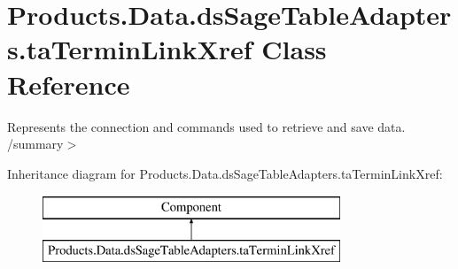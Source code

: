\hypertarget{class_products_1_1_data_1_1ds_sage_table_adapters_1_1ta_termin_link_xref}{}\section{Products.\+Data.\+ds\+Sage\+Table\+Adapters.\+ta\+Termin\+Link\+Xref Class Reference}
\label{class_products_1_1_data_1_1ds_sage_table_adapters_1_1ta_termin_link_xref}


Represents the connection and commands used to retrieve and save data. /summary$>$  


Inheritance diagram for Products.\+Data.\+ds\+Sage\+Table\+Adapters.\+ta\+Termin\+Link\+Xref\+:\begin{figure}[H]
\begin{center}
\leavevmode
\includegraphics[height=2.000000cm]{class_products_1_1_data_1_1ds_sage_table_adapters_1_1ta_termin_link_xref}
\end{center}
\end{figure}
